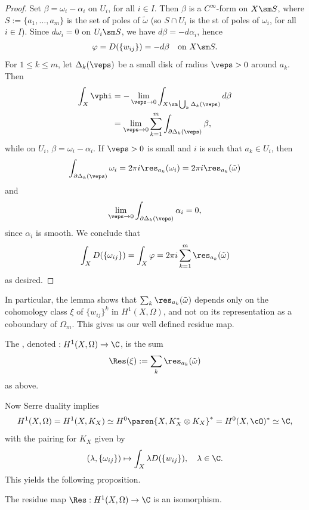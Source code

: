 \documentclass[11pt]{report}
\begin{document}
\begin{proof}
Set $\beta = \omega_i - \alpha_i$ on $U_i$, for all $i \in I$. Then $\beta$ is a $C^\infty$-form on $X \sm S$, where $S := \{a_1,\dots,a_m\}$ is the set of poles of $\tilde \omega$ (so $S\cap U_i$ is the st of poles of $\omega_i$, for all $i \in I$). Since $d\omega_i =0$ on $U_i \sm S$, we have $d \beta = -d\alpha_i$, hence
\begin{align*}
\varphi = D(\{w_{ij}\}) = - d\beta \quad \text{on } X \sm S.
\end{align*}
For $1 \leq k \leq m$, let $\Delta_k(\veps)$ be a small disk of radius $\veps>0$ around $a_k$. Then
\begin{align*}
\int_X \vphi &= -\lim_{\veps \to 0}\int _{X \sm \bigcup_k \Delta_k(\veps)}d\beta \\
&= \lim_{\veps \to 0}\sum_{k=1}^m \int_{\partial \Delta_k(\veps)}\beta,
\end{align*}
while on $U_i$, $\beta = \omega_i - \alpha_i$. If $\veps >0$ is small and $i$ is such that $a_k \in U_i$, then
\begin{align*}
\int_{\partial \Delta_k(\veps)} \omega_i = 2\pi i \res_{a_k}(\omega_i)=2\pi i \res_{a_k}(\tilde \omega)
\end{align*}
and
\begin{align*}
\lim_{\veps \to 0}\int_{\partial \Delta_k(\veps)}\alpha_i =0,
\end{align*}
since $\alpha_i$ is smooth. We conclude that
\begin{align*}
\int_X D(\{\omega_{ij}\}) = \int_X \varphi = 2 \pi i \sum_{k=1}^m \res_{a_k}(\tilde \omega)
\end{align*}
as desired.
\end{proof}

In particular, the lemma shows that $\sum_k \res_{a_k}(\tilde \omega)$ depends only on the cohomology class $\xi$ of $\{w_{ij}\}^k$ in $H^1(X,\Omega)$, and not on its representation as a coboundary of $\Omega_m$. This gives us our well defined residue map.

\begin{defn}
The , denoted \term[]{$\Res$} $:H^1(X,\Omega)\to \C$, is the sum
\begin{align*}
\Res(\xi):= \sum_{k}\res_{a_k}(\tilde \omega)
\end{align*}
as above.
\end{defn}

Now Serre duality implies
\begin{align*}
H^1(X,\Omega)=H^1(X,K_X)\simeq H^0\paren{X, K_X^*\otimes K_X}^* = H^0(X,\cO)^* \simeq \C,
\end{align*}
with the pairing for $K_X$ given by
\begin{align*}
(\lambda,\{\omega_{ij}\}) \mapsto \int _X \lambda D(\{w_{ij}\}), \quad \lambda \in \C.
\end{align*}
This yields the following proposition.
\begin{prop}
The residue map $\Res:H^1(X,\Omega) \to \C$ is an isomorphism.
\end{prop}
\end{document}
